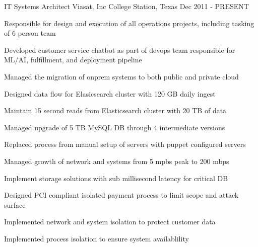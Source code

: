 

\begin{cventries}

  \cventry
    {IT Systems Architect} %
    {Viasat, Inc} %
    {College Station, Texas} %
    {Dec 2011 - PRESENT} %
    {
      \begin{cvitems} %
        \item {Responsible for design and execution of all operations projects, including tasking of 6 person team}
        \item {Developed customer service chatbot as part of devops team responsible for ML/AI, fulfillment, and deployment pipeline}
        \item {Managed the migration of onprem systems to both public and private cloud}
        \item {Designed data flow for Elasicsearch cluster with 120 GB daily ingest}
        \item {Maintain 15 second reads from Elasticsearch cluster with 20 TB of data}
        \item {Managed upgrade of 5 TB MySQL DB through 4 intermediate versions}
        \item {Replaced process from manual setup of servers with puppet configured servers}
        \item {Managed growth of network and systems from 5 mpbs peak to 200 mbps}
        \item {Implement storage solutions with sub millisecond latency for critical DB}
        \item {Designed PCI compliant isolated payment process to limit scope and attack surface}
        \item {Implemented network and system isolation to protect customer data}
        \item {Implemented process isolation to ensure system availablility}
      \end{cvitems}
    }


\end{cventries}
